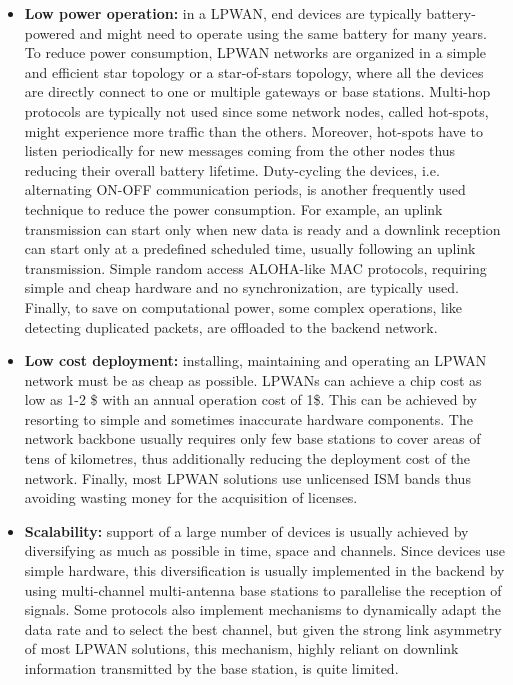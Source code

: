 \begin{itemize}
\item \textbf{Low power operation:} in a \gls{LPWAN}, end devices are typically battery-powered and might need to operate using the same battery for many years. To reduce power consumption, \gls{LPWAN} networks are organized in a simple and efficient star topology or a star-of-stars topology, where all the devices are directly connect to one or multiple gateways or base stations. Multi-hop protocols are typically not used since some network nodes, called hot-spots, might experience more traffic than the others. Moreover, hot-spots have to listen periodically for new messages coming from the other nodes thus reducing their overall battery lifetime. Duty-cycling the devices, i.e. alternating ON-OFF communication periods, is another frequently used technique to reduce the power consumption.
For example, an uplink transmission can start only when new data is ready and a downlink reception can start only at a predefined scheduled time, usually following an uplink transmission. Simple random access ALOHA-like MAC protocols, requiring simple and cheap hardware and no synchronization, are typically used. Finally, to save on computational power, some complex operations, like detecting duplicated packets, are offloaded to the backend network.

\item \textbf{Low cost deployment:} installing, maintaining and operating an \gls{LPWAN} network must be as cheap as possible. \glspl{LPWAN} can achieve a chip cost as low as 1-2 \$ with an annual operation cost of 1\$. This can be achieved by resorting to simple and sometimes inaccurate hardware components. The network backbone usually requires only few base stations to cover areas of tens of kilometres, thus additionally reducing the deployment cost of the network. Finally, most \gls{LPWAN} solutions use unlicensed \gls{ISM} bands thus avoiding wasting money for the acquisition of licenses.

\item \textbf{Scalability:} support of a large number of devices is usually achieved by diversifying as much as possible in time, space and channels. Since devices use simple hardware, this diversification is usually implemented in the backend by using multi-channel multi-antenna base stations to parallelise the reception of signals. Some protocols also implement mechanisms to dynamically adapt the data rate and to select the best channel, but given the strong link asymmetry of most \gls{LPWAN} solutions, this mechanism, highly reliant on downlink information transmitted by the base station, is quite limited.

\end{itemize}

